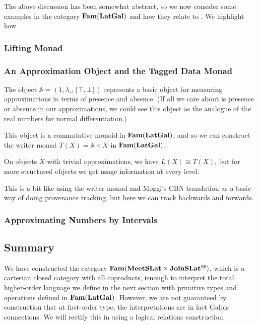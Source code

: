 The above discussion has been somewhat abstract, so we now consider
some examples in the category $\mathbf{Fam}(\mathbf{LatGal})$ and how they relate to
\GPS. We highlight how

\subsubsection{Lifting Monad}


\subsubsection{An Approximation Object and the Tagged Data Monad}


The object $\mathbb{A} = (1, \lambda \_.\, \{\top,\bot\})$ represents
a basic object for measuring approximations in terms of presence and
absence. (If all we care about is presence or absence in our
approximations, we could see this object as the analogue of the real
numbers for normal differentiation.)

This object is a commutative monoid in $\mathbf{Fam}(\mathbf{LatGal})$, and so we can
construct the writer monad $T(X) = \mathbb{A} \times X$ in
$\mathbf{Fam}(\mathbf{LatGal})$.

On objects $X$ with trivial approximations, we have $L(X) \cong T(X)$,
but for more structured objects we get usage information at every level.

This is a bit like using the writer monad and Moggi's CBN translation
as a basic way of doing provenance tracking, but here we can track
backwards and forwards.

\subsubsection{Approximating Numbers by Intervals}


\subsection{Summary}

We have constructed the category
$\mathbf{Fam}(\mathbf{MeetSLat} \times \mathbf{JoinSLat}^{\mathsf{op}})$, which is a cartesian closed
category with all coproducts, ienough to interpret the total
higher-order language we define in the next section with primitive
types and operations defined in $\mathbf{Fam}(\mathbf{LatGal})$. However, we are not
guaranteed by construction that at first-order type, the
interpretations are in fact Galois connections. We will rectify this
in  using a logical relations construction.

